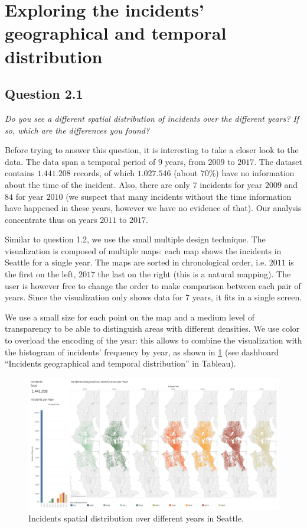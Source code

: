 \section{Exploring the incidents' geographical and temporal distribution}

\subsection*{Question 2.1}
\textit{Do you see a different spatial distribution of incidents over the different years? If so, which are the differences you found?}

Before trying to answer this question, it is interesting to take a closer look to the data.
The data span a temporal period of $9$ years, from $2009$ to $2017$.
The dataset contains $1.441.208$ records, of which $1.027.546$ (about $70\%$) have no information about the time of the incident.
Also, there are only $7$ incidents for year $2009$ and $84$ for year $2010$ (we suspect that many incidents without the time information have happened in these years, however we have no evidence of that).
Our analysis concentrate thus on years $2011$ to $2017$.

Similar to question 1.2, we use the small multiple design technique.
The visualization is composed of multiple maps: each map shows the incidents in Seattle for a single year.
The maps are sorted in chronological order, i.e. $2011$ is the first on the left, $2017$ the last on the right (this is a natural mapping).
The user is however free to change the order to make comparison between each pair of years.
Since the visualization only shows data for $7$ years, it fits in a single screen.

We use a small size for each point on the map and a medium level of transparency to be able to distinguish areas with different densities.
We use color to overload the encoding of the year:
this allows to combine the visualization with the histogram of incidents' frequency by year, as shown in \cref{fig:2_1_geographical_temporal_distribution} (see dashboard ``Incidents geographical and temporal distribution'' in Tableau).

\begin{figure}[h]
	\centering
	\includegraphics[width=\columnwidth]{figures/2_1_geographical_temporal_distribution}
	\caption{Incidents spatial distribution over different years in Seattle.}
	\label{fig:2_1_geographical_temporal_distribution}
\end{figure}

